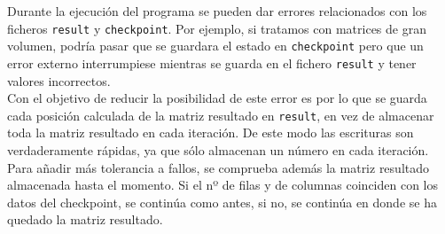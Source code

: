 Durante la ejecución del programa se pueden dar errores relacionados con los ficheros \texttt{result} y \texttt{checkpoint}.
Por ejemplo, si tratamos con matrices de gran volumen, podría pasar que se guardara el estado en \texttt{checkpoint} pero que un error externo interrumpiese mientras se guarda en el fichero \texttt{result} y tener valores incorrectos.\\
Con el objetivo de reducir la posibilidad de este error es por lo que se guarda cada posición calculada de la matriz resultado en \texttt{result}, en vez de almacenar toda la matriz resultado en cada iteración. De este modo las escrituras son verdaderamente rápidas, ya que sólo almacenan un número en cada iteración.
Para añadir más tolerancia a fallos, se comprueba además la matriz resultado almacenada hasta el momento. Si el nº de filas y de columnas coinciden con los datos del checkpoint, se continúa como antes, si no, se continúa en donde se ha quedado la matriz resultado. 
